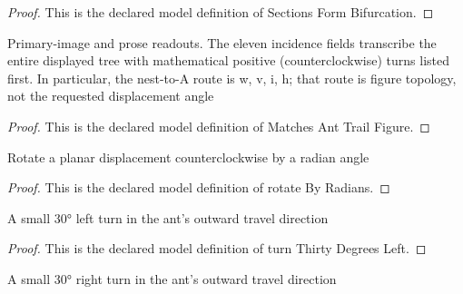 \begin{proof}
  This is the declared model definition of Sections Form Bifurcation.
\end{proof}
\begin{definition}
  \label{def:physics:phyx-mini-0734:phyxminiproblems-problemphyxmini0734-matchesanttrailfigure}
  Primary-image and prose readouts. The eleven incidence fields transcribe the entire displayed tree with mathematical positive (counterclockwise) turns listed first. In particular, the nest-to-A route is w, v, i, h; that route is figure topology, not the requested displacement angle
\end{definition}
\begin{proof}
  This is the declared model definition of Matches Ant Trail Figure.
\end{proof}
\begin{definition}
  \label{def:physics:phyx-mini-0734:phyxminiproblems-problemphyxmini0734-rotatebyradians}
  Rotate a planar displacement counterclockwise by a radian angle
\end{definition}
\begin{proof}
  This is the declared model definition of rotate By Radians.
\end{proof}
\begin{definition}
  \label{def:physics:phyx-mini-0734:phyxminiproblems-problemphyxmini0734-turnthirtydegreesleft}
  A small 30° left turn in the ant's outward travel direction
\end{definition}
\begin{proof}
  This is the declared model definition of turn Thirty Degrees Left.
\end{proof}
\begin{definition}
  \label{def:physics:phyx-mini-0734:phyxminiproblems-problemphyxmini0734-turnthirtydegreesright}
  A small 30° right turn in the ant's outward travel direction
\end{definition}
